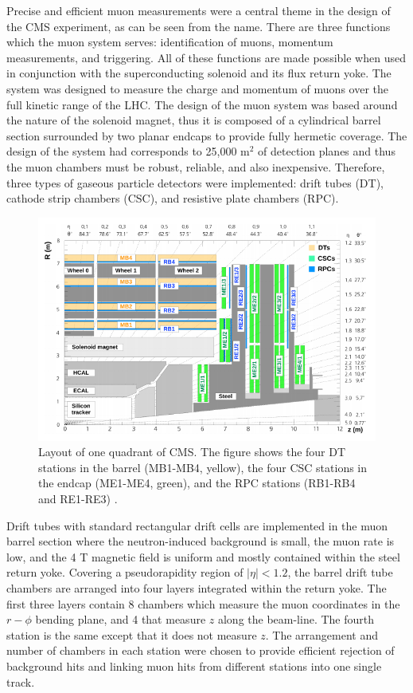 Precise and efficient muon measurements were a central theme in the design of the CMS experiment, as can be seen from the name. There are three functions which the muon system serves: identification of muons, momentum measurements, and triggering. All of these functions are made  possible when used in conjunction with the superconducting solenoid and its flux return yoke. The system was designed to measure the charge and momentum of muons over the full kinetic range of the LHC. The design of the muon system was based around the nature of the solenoid magnet, thus it is composed of a cylindrical barrel section surrounded by two planar endcaps to provide fully hermetic coverage. The design of the system had corresponds to 25,000 m$^2$ of detection planes and thus the muon chambers must be robust, reliable, and also inexpensive. Therefore, three types of gaseous particle detectors were implemented: drift tubes (DT), cathode strip chambers (CSC), and resistive plate chambers (RPC). 

\begin{figure}
\includegraphics[width=\textwidth]{Figures/CMSLongitudinalView.png}
\caption{Layout of one quadrant of CMS. The figure shows the four DT stations in the barrel (MB1-MB4, yellow), the four CSC stations in the endcap (ME1-ME4, green), and the RPC stations (RB1-RB4 and RE1-RE3) \cite{CMSexperiment}.}
\label{fig-CMSLongitudinalView}
\end{figure}

Drift tubes with standard rectangular drift cells are implemented in the muon barrel section where the neutron-induced background is small, the muon rate is low, and the 4 T magnetic field is uniform and mostly contained within the steel return yoke. Covering a pseudorapidity region of $|\eta|<1.2$, the barrel drift tube chambers are arranged into four layers integrated within the return yoke. The first three layers contain 8 chambers which measure the muon coordinates in the $r-\phi$ bending plane, and 4 that measure $z$ along the beam-line. The fourth station is the same except that it does not measure $z$. The arrangement and number of chambers in each station were chosen to provide efficient rejection of background hits and linking muon hits from different stations into one single track.

